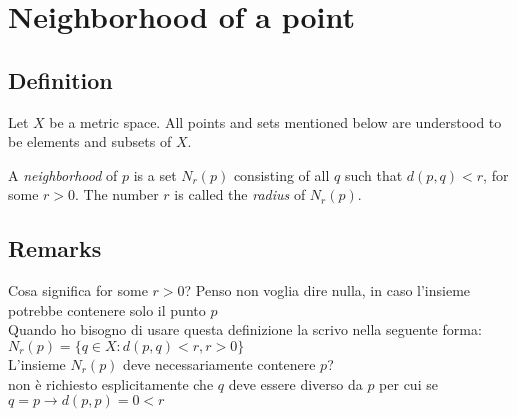 \documentclass[a4paper,10pt]{article}
\begin{document}

\section{Neighborhood of a point}
\subsection{Definition}


Let $ X $ be a metric space. All points and sets mentioned below
are understood to be elements and subsets of $ X $.

A \textit{neighborhood} of $ p $ is a set $ N_{r}(p) $ consisting of all $ q $ such that
$ d(p,q) < r $, for some $ r > 0 $. The number $ r $ is called the \textit{radius} of $ N_{r}(p) $.

\subsection{Remarks}

Cosa significa for some $ r > 0 $? Penso non voglia dire nulla, in caso l'insieme potrebbe contenere solo il punto $ p $\\
Quando ho bisogno di usare questa definizione la scrivo nella seguente forma: \\
$ N_{r}(p)=\{q \in X : d(p,q)<r, r>0 \} $ \\
L'insieme $ N_{r}(p) $ deve necessariamente contenere $ p $? \\
non è richiesto esplicitamente che $ q $ deve essere diverso da $ p $ per cui se $ q=p \rightarrow d(p,p)=0 < r $
\end{document}
